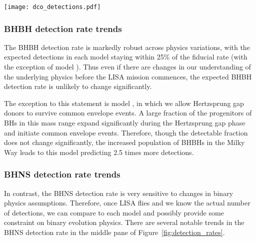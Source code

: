 \begin{figure*}[p]
    \centering
    \texttt{[image: dco\_detections.pdf]}
    \caption{The number of expected detections in the LISA mission for different DCO types and model variations. Error bars show the 50\% (solid) and 90\% (dotted) confidence intervals. The left axis and grid lines show the number of detections in a four year LISA mission and the right axis shows an approximation of the number of detections in a 10 year mission (we scale the axis by $\sqrt{T_{\rm obs}}$, see Table~\ref{tab:detection_rates} for exact rates). Each model is described in further detail in Table~\ref{tab:physics_variations} and details of the fiducial assumptions are in Section~\ref{sec:fiducial_physics}.}
    \label{fig:detection_rates}
\end{figure*}

\subsubsection{BHBH detection rate trends}
The BHBH detection rate is markedly robust across physics variations, with the expected detections in each model staying within 25\% of the fiducial rate (with the exception of model \modOpt{}). Thus even if there are changes in our understanding of the underlying physics before the LISA mission commences, the expected BHBH detection rate is unlikely to change significantly.

The exception to this statement is model \modOpt{}, in which we allow Hertzsprung gap donors to survive common envelope events. A large fraction of the progenitors of BHs in this mass range expand significantly during the Hertzsprung gap phase and initiate common envelope events. Therefore, though the detectable fraction does not change significantly, the increased population of BHBHs in the Milky Way leads to this model predicting 2.5 times more detections.

\subsubsection{BHNS detection rate trends}
In contrast, the BHNS detection rate is very sensitive to changes in binary physics assumptions. Therefore, once LISA flies and we know the actual number of detections, we can compare to each model and possibly provide some constraint on binary evolution physics. There are several notable trends in the BHNS detection rate in the middle pane of Figure~\ref{fig:detection_rates}.

